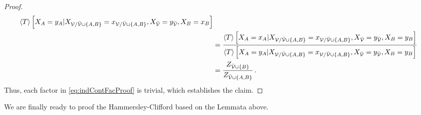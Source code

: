 \begin{proof}
\begin{align*}
{            \left\langle T\right\rangle \left[ 
                X_{A} =y_{A}
             | X_{\mathcal{V}/\bar{\mathcal{V}}\cup\{A,B\}}=x_{\mathcal{V}/\bar{\mathcal{V}}\cup\{A,B\}} , X_{\bar{\mathcal{V}}}=y_{\bar{\mathcal{V}}}, X_{B}=x_{B} \right]
        } \\
        & =
        \frac{
            \left\langle T\right\rangle \left[ 
                X_{A}=x_{A}
             | X_{\mathcal{V}/\bar{\mathcal{V}}\cup\{A,B\}}=x_{\mathcal{V}/\bar{\mathcal{V}}\cup\{A,B\}}, X_{\bar{\mathcal{V}}}=y_{\bar{\mathcal{V}}}, X_{B} = y_{B} \right]
        }{
            \left\langle T\right\rangle \left[ 
                X_{A} =y_{A}
             | X_{\mathcal{V}/\bar{\mathcal{V}}\cup\{A,B\}}=x_{\mathcal{V}/\bar{\mathcal{V}}\cup\{A,B\}}, X_{\bar{\mathcal{V}}}=y_{\bar{\mathcal{V}}},X_{B} = y_{B} \right]
        } \\
        & =
        \frac{
            Z_{\bar{\mathcal{V}}\cup\{B\}}
        }{
            Z_{\bar{\mathcal{V}}\cup\{A,B\}}
        } \, .
    \end{align*}
    Thus, each factor in \eqref{eq:indContFacProof} is trivial, which establishes the claim.
\end{proof}

We are finally ready to proof the Hammersley-Clifford  based on the Lemmata above.

